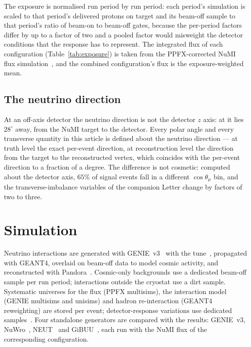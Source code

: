 \documentclass[aps,prd,twocolumn,superscriptaddress,nofootinbib,floatfix]{revtex4-2}
\begin{document}
The exposure is normalised run period by run period: each period's simulation is scaled to that
period's delivered protons on target and its beam-off sample to that period's ratio of beam-on to
beam-off gates, because the per-period factors differ by up to a factor of two and a pooled factor
would misweight the detector conditions that the response has to represent. The integrated flux of
each configuration (Table~\ref{tab:exposure}) is taken from the PPFX-corrected NuMI flux
simulation~\cite{ppfx}, and the combined configuration's flux is the exposure-weighted mean.

\subsection{The neutrino direction}
\label{sec:beamdir}

At an off-axis detector the neutrino direction is not the detector $z$ axis: at \uboone{} it lies
$28^\circ$ away, from the NuMI target to the detector. Every polar angle and every transverse
quantity in this article is defined about the neutrino direction --- at truth level the exact
per-event direction, at reconstruction level the direction from the target to the reconstructed
vertex, which coincides with the per-event direction to a fraction of a degree. The difference is
not cosmetic: computed about the detector axis, $65\%$ of signal events fall in a different
$\cos\theta_\mu$ bin, and the transverse-imbalance variables of the companion Letter change by
factors of two to three.

\section{Simulation}
\label{sec:mc}

Neutrino interactions are generated with GENIE~v3~\cite{genie,genie3} with the \uboone{}
tune~\cite{uboone_tune}, propagated with GEANT4, overlaid on beam-off data to model cosmic
activity, and reconstructed with Pandora~\cite{pandora,uboone_pandora}. Cosmic-only backgrounds
use a dedicated beam-off sample per run period; interactions outside the cryostat use a dirt
sample. Systematic universes for the flux (PPFX multisims), the interaction model (GENIE multisims
and unisims) and hadron re-interaction (GEANT4 reweighting) are stored per event; detector-response
variations use dedicated samples~\cite{uboone_detvar}. Four standalone generators are compared with
the results: GENIE~v3, NuWro~\cite{nuwro}, NEUT~\cite{neut,neut2021} and GiBUU~\cite{gibuu}, each
run with the NuMI flux of the corresponding configuration.
\end{document}

